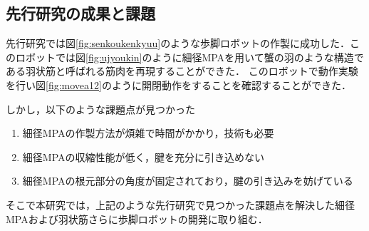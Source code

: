 \subsection{先行研究の成果と課題}
先行研究\cite{hasegawa}では図\ref{fig:senkoukenkyuu}のような歩脚ロボットの作製に成功した．このロボットでは図\ref{fig:ujyoukin}のように細径MPAを用いて蟹の羽のような構造である羽状筋と呼ばれる筋肉を再現することができた\cite{hasegawa}．
このロボットで動作実験を行い図\ref{fig:movea12}のように開閉動作をすることを確認することができた．

しかし，以下のような課題点が見つかった
\begin{enumerate}
  \item 細径MPAの作製方法が煩雑で時間がかかり，技術も必要
  \item 細径MPAの収縮性能が低く，腱を充分に引き込めない
  \item 細径MPAの根元部分の角度が固定されており，腱の引き込みを妨げている
\end{enumerate}
そこで本研究では，上記のような先行研究で見つかった課題点を解決した細径MPAおよび羽状筋さらに歩脚ロボットの開発に取り組む．
